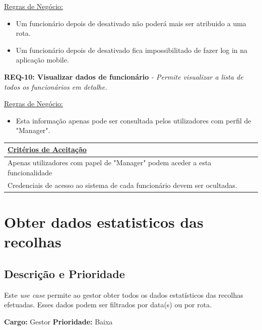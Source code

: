 \documentclass{scrreprt}
\begin{document}
		\underline{Regras de Negócio: } 
		\begin{itemize}
		\item Um funcionário depois de desativado não poderá mais ser atribuido a uma rota.
		\item Um funcionário depois de desativado fica impossibilitado de fazer log in na aplicação mobile.
    	\end{itemize}
		
		\textbf{REQ-10: Visualizar dados de funcionário}\newline
	    \textit{- Permite visualizar a lista de todos os funcionários em detalhe.}\newline\newline
		
		\underline{Regras de Negócio: } 
		\begin{itemize}
		\item Esta informação apenas pode ser consultada pelos utilizadores com perfil de "Manager".
    	\end{itemize}
		
	    	\begin{tabular}{|p{5.2in}|p{0.7in}|} \hline 
		\underline{Critérios de Aceitação} \\ \hline 
		Apenas utilizadores com papel de "Manager" podem aceder a esta funcionalidade \\ \hline 
		Credenciais de acesso ao sistema de cada funcionário devem ser ocultadas.\\ \hline
	\end{tabular}\newline\newline
	
	\section{Obter dados estatisticos das recolhas}
	
	\subsection{Descrição e Prioridade}
	
	Este \textit{use case} permite ao gestor obter todos os dados estatísticos das recolhas efetuadas. Esses dados podem ser filtrados por data(s) ou por rota.
	
	\textbf{Cargo: }Gestor  \newline
	\textbf{Prioridade: }Baixa \newline
	
\end{document}
